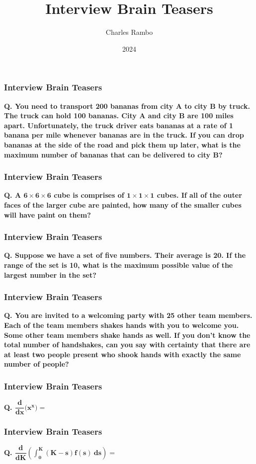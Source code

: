 \documentclass{beamer}
\title{Interview Brain Teasers}
\author{Charles Rambo}
\institute{UCLA Anderson}
\date{2024}
\begin{document}



\begin{frame}[t]
\frametitle{Interview Brain Teasers}
{\bf Q. You need to transport 200 bananas from city A to city B by truck. The truck can hold 100 bananas. City A and city B are 100 miles apart. Unfortunately, the truck driver eats bananas at a rate of 1 banana per mile whenever bananas are in the truck. If you can drop bananas at the side of the road and pick them up later, what is the maximum number of bananas that can be delivered to city B?}

\end{frame}

\begin{frame}[t]
\frametitle{Interview Brain Teasers}
{\bf Q. A $\boldsymbol{6\times 6\times 6}$ cube is comprises of $\boldsymbol{1\times 1\times 1}$ cubes. If all of the outer faces of the larger cube are painted, how many of the smaller cubes will have paint on them?}

\end{frame}

\begin{frame}[t]
\frametitle{Interview Brain Teasers}
{\bf Q. Suppose we have a set of five numbers. Their average is 20. If the range of the set is 10, what is the maximum possible value of the largest number in the set?}

\end{frame}

\begin{frame}[t]
\frametitle{Interview Brain Teasers}
{\bf Q. You are invited to a welcoming party with 25 other team members. Each of the team members shakes hands with you to welcome you. Some other team members shake hands as well. If you don't know the total number of handshakes, can you say with certainty that there are at least two people present who shook hands with exactly the same number of people?}

\end{frame}


\begin{frame}[t]
\frametitle{Interview Brain Teasers}
{\bf Q. $\boldsymbol{\dfrac{d}{dx}\Big(x^x\Big) = }$}

\end{frame}

\begin{frame}[t]
\frametitle{Interview Brain Teasers}
{\bf Q. $\boldsymbol{\dfrac{d}{dK}\left(\displaystyle\int_0^K (K - s) f(s)\ ds\right) = }$}

\end{frame}
\end{document}
